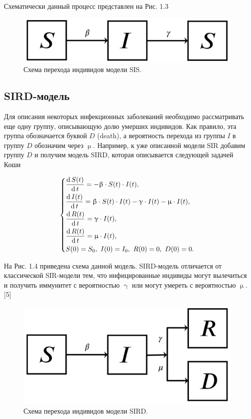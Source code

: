 \documentclass[a4paper, 14pt]{extreport}
\renewcommand{\beta}{\upbeta}
\renewcommand{\gamma}{\upgamma}
\renewcommand{\mu}{\upmu}
\renewcommand{\d}{\operatorname{d}}
\begin{document}
	Схематически данный процесс представлен на Рис. 1.3
	
	\begin{figure}[h!]
		\centering
		\includegraphics[scale=0.25]{images/img02}
		\caption{Схема перехода индивидов модели SIS.}
		\label{fig:img02}
	\end{figure}
	
	\subsection{SIRD-модель}
	Для описания некоторых инфекционных заболеваний необходимо рассматривать еще одну группу, описывающую долю умерших индивидов. Как правило, эта группа обозначается буквой $D$ (death), а вероятность перехода из группы $I$ в группу $D$ обозначим через $\mu$. Например, к уже описанной модели SIR добавим группу $D$ и получим модель SIRD, которая описывается следующей задачей Коши
	
	\begin{equation}
		\begin{dcases}
			\dfrac {\d S(t)}{\d t} = -\beta \cdot S(t) \cdot I(t),\\
			\dfrac{\d I(t)}{\d t} = \beta \cdot S(t)\cdot I(t) - \gamma\cdot I(t) - \mu\cdot I(t),\\
			\dfrac{\d R(t)}{\d t} = \gamma\cdot I(t), \\
			\dfrac{\d R(t)}{\d t} = \mu\cdot I(t),\\
			S(0) = S_0,\ I(0) = I_0,\ R(0) = 0,\ D(0) = 0.
		\end{dcases}
	\end{equation}
	
	На Рис. 1.4
	приведена схема данной модель. SIRD-модель отличается от классической SIR-модели тем, что инфицированные индивиды могут вылечиться и получить иммунитет с вероятностью $\gamma$ или могут умереть с вероятностью $\mu$. [5]
	\begin{figure}[h]
		\centering
		\includegraphics[scale=0.25]{images/img03}
		\caption{Схема перехода индивидов модели SIRD.}
		\label{fig:img03}
	\end{figure}
	
\end{document}
